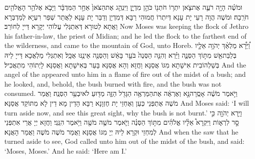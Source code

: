 \newperek
{}
{וּמֹשֶׁ֗ה הָיָ֥ה רֹעֶ֛ה אֶת\maqqaf צֹ֛אן יִתְר֥וֹ חֹתְנ֖וֹ כֹּהֵ֣ן מִדְיָ֑ן וַיִּנְהַ֤ג אֶת\maqqaf הַצֹּאן֙ אַחַ֣ר הַמִּדְבָּ֔ר וַיָּבֹ֛א אֶל\maqqaf הַ֥ר הָאֱלֹהִ֖ים חֹרֵֽבָה׃}
{וּמֹשֶׁה הֲוָה רָעֵי יָת עָנָא דְּיִתְרוֹ חֲמוּהִי רַבָּא דְּמִדְיָן וְדַבַּר יָת עָנָא לַאֲתַר שְׁפַר רִעְיָא לְמַדְבְּרָא וַאֲתָא לְטוּרָא דְּאִתְגְּלִי עֲלוֹהִי יְקָרָא דַּייָ לְחוֹרֵב׃}
{Now Moses was keeping the flock of Jethro his father-in-law, the priest of Midian; and he led the flock to the farthest end of the wilderness, and came to the mountain of God, unto Horeb.}{}
{וַ֠יֵּרָ֠א מַלְאַ֨ךְ יְהֹוָ֥ה אֵלָ֛יו בְּלַבַּת\maqqaf אֵ֖שׁ מִתּ֣וֹךְ הַסְּנֶ֑ה וַיַּ֗רְא וְהִנֵּ֤ה הַסְּנֶה֙ בֹּעֵ֣ר בָּאֵ֔שׁ וְהַסְּנֶ֖ה אֵינֶ֥נּוּ אֻכָּֽל׃}
{וְאִתְגְּלִי מַלְאֲכָא דַּייָ לֵיהּ בְּשַׁלְהוֹבִית אִישָׁתָא מִגּוֹ אֲסַנָּא וַחֲזָא וְהָא אֲסַנָּא בָּעַר בְּאִישָׁתָא וַאֲסַנָּא לָיְתוֹהִי מִתְאֲכִיל׃}
{And the angel of the \lord\space appeared unto him in a flame of fire out of the midst of a bush; and he looked, and, behold, the bush burned with fire, and the bush was not consumed.}{}
{וַיֹּ֣אמֶר מֹשֶׁ֔ה אָסֻֽרָה\maqqaf נָּ֣א וְאֶרְאֶ֔ה אֶת\maqqaf הַמַּרְאֶ֥ה הַגָּדֹ֖ל הַזֶּ֑ה מַדּ֖וּעַ לֹא\maqqaf יִבְעַ֥ר הַסְּנֶֽה׃}
{וַאֲמַר מֹשֶׁה אֶתְפְּנֵי כְּעַן וְאֶחְזֵי יָת חֶזְוָנָא רַבָּא הָדֵין מָא דֵין לָא מִתּוֹקַד אֲסַנָּא׃}
{And Moses said: ‘I will turn aside now, and see this great sight, why the bush is not burnt.’}{}
{וַיַּ֥רְא יְהֹוָ֖ה כִּ֣י סָ֣ר לִרְא֑וֹת וַיִּקְרָא֩ אֵלָ֨יו אֱלֹהִ֜ים מִתּ֣וֹךְ הַסְּנֶ֗ה וַיֹּ֛אמֶר מֹשֶׁ֥ה מֹשֶׁ֖ה וַיֹּ֥אמֶר הִנֵּֽנִי׃}
{וַחֲזָא יְיָ אֲרֵי אִתְפְּנֵי לְמִחְזֵי וּקְרָא לֵיהּ יְיָ מִגּוֹ אֲסַנָּא וַאֲמַר מֹשֶׁה מֹשֶׁה וַאֲמַר הָאֲנָא׃}
{And when the \lord\space saw that he turned aside to see, God called unto him out of the midst of the bush, and said: ‘Moses, Moses.’ And he said: ‘Here am I.’}{}
